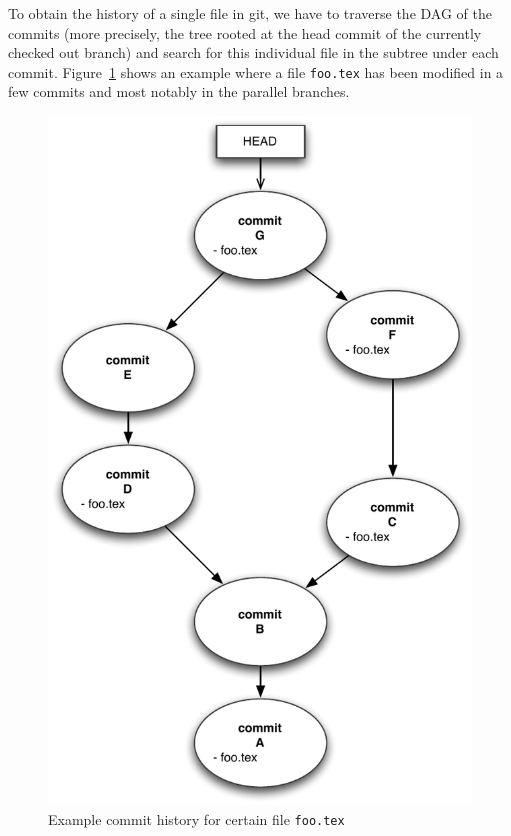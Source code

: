 To obtain the history of a single file in git, we have to traverse the DAG of the commits (more precisely, the tree rooted at the head commit of the currently checked out branch) and search for this individual file in the subtree under each commit.  Figure~\ref{fig:git-commit1} shows an example where a file \texttt{foo.tex} has been modified in a few commits and most notably in the parallel branches.

\begin{figure}
\centering
\includegraphics[scale=\figscale]{./figures/git-commit-history1}
\caption{Example commit history for certain file \texttt{foo.tex}} \label{fig:git-commit1}
\end{figure}

